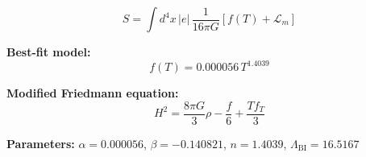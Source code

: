
\begin{equation}
  S = \int d^4x \, |e| \, \frac{1}{16\pi G} \left[ f(T) + \mathcal{L}_m \right]
\end{equation}

\textbf{Best-fit model:}
\begin{equation}
  f(T) = 0.000056 \, T^{1.4039}
\end{equation}

\textbf{Modified Friedmann equation:}
\begin{equation}
  H^2 = \frac{8\pi G}{3} \rho - \frac{f}{6} + \frac{T f_T}{3}
\end{equation}

\textbf{Parameters:}
$\alpha = 0.000056$, \quad
$\beta = -0.140821$, \quad
$n = 1.4039$, \quad
$\Lambda_{\text{BI}} = 16.5167$